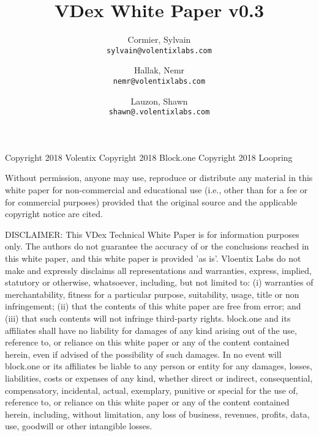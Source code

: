 \documentclass[]{article}
\title{VDex White Paper v0.3}
\author{
	Cormier, Sylvain\\
	\texttt{sylvain@volentixlabs.com}
	\and
	Hallak, Nemr\\
	\texttt{nemr@volentixlabs.com}
	\and
	Lauzon, Shawn\\
	\texttt{shawn@.volentixlabs.com}
}
\begin{document}
\tableofcontents
\maketitle

Copyright 2018 Volentix
Copyright 2018 Block.one
Copyright 2018 Loopring

Without permission, anyone may use, reproduce or distribute any material in this white paper for non-commercial and educational use (i.e., other than for a fee or for commercial purposes) provided that the original source and the applicable copyright notice are cited.

DISCLAIMER: This VDex Technical White Paper  is for information purposes only. The authors do not guarantee the accuracy of or the conclusions reached in this white paper, and this white paper is provided 'as is'. 
Vloentix Labs do not make and expressly disclaims all representations and warranties, express, implied, statutory or otherwise, whatsoever, including, but not limited to: (i) warranties of merchantability, fitness for a particular purpose, suitability, usage, title or non infringement; (ii) that the contents of this white paper are free from error; and (iii) that such contents will not infringe third-party rights. block.one and its affiliates shall have no liability for damages of any kind arising out of the use, reference to, or reliance on this white paper or any of the content contained herein, even if advised of the possibility of such damages. In no event will block.one or its affiliates be liable to any person or entity for any damages, losses, liabilities, costs or expenses of any kind, whether direct or indirect, consequential, compensatory, incidental, actual, exemplary, punitive or special for the use of, reference to, or reliance on this white paper or any of the content contained herein, including, without limitation, any loss of business, revenues, profits, data, use, goodwill or other intangible losses.
\end{document}
